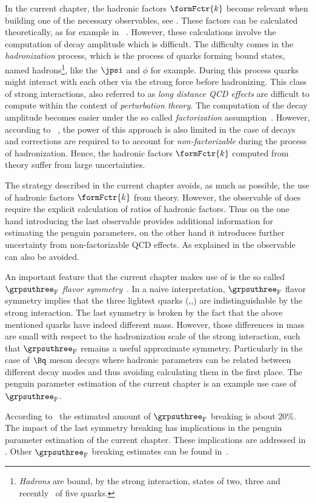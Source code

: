 In the current chapter, the hadronic factors $\formFctr{k}$ become relevant when building
one of the necessary observables, see . These factors can be calculated
theoretically, as for example in ~\cite{DeBruyn-thesis}. However, these calculations involve
the computation of \BJpsiX decay amplitude which is difficult. The difficulty comes in the
{\it hadronization} process, which is the process of quarks forming bound states, named
hadrons\footnote{ {\it Hadrons} are bound, by the strong interaction, states of two,
three and recently~\cite{Aaij:2016nsc} of five quarks.}, like the $\jpsi$ and $\phi$ for example.
During this process quarks might interact with each other via the strong force before hadronizing.
This class of strong interactions, also referred to as {\it long distance QCD effects}
are difficult to compute within the context of {\it perturbation theory}.
The computation of the \BJpsiX decay amplitude becomes easier under the so called
{\it factorization} assumption~\cite{HAAN1970448,Wirbel1985,CABIBBO1978418,FAKIROV1978315}.
However, according to ~\cite{DeBruyn-thesis},
the power of this approach is also limited in the case of \BJpsiX decays and corrections
are required to to account for {\it non-factorizable} during the process of hadronization.
Hence, the hadronic factors $\formFctr{k}$ computed from theory suffer from large uncertainties.

The strategy described in the current chapter avoids, as much as possible, the use of hadronic
factors $\formFctr{k}$ from theory. However, the observable of 
does require the explicit calculation of ratios of hadronic factors. Thus on the one hand
introducing the last observable provides additional information for estimating the penguin
parameters, on the other hand it introduces further uncertainty from non-factorizable QCD effects.
As explained in  the observable  can also be avoided.

An important feature that the current chapter makes use of is the so called
$\grpsuthree_{\rm F}$ {\it flavor symmetry}~\cite{GELLMANN1964214,NEEMAN1961222}.
In a naive interpretation, $\grpsuthree_{\rm F}$ flavor symmetry implies that the three lightest quarks (\uquark,\dquark,\squark)
are indistinguishable by the strong interaction. The last symmetry is broken by the fact that the above
mentioned quarks have indeed different mass. However, those differences in mass are small with respect
to the hadronization scale \lqcd of the strong interaction, such that $\grpsuthree_{\rm F}$
remains a useful approximate symmetry. Particularly in the case of $\Bq$ meson decays where hadronic
parameters can be related between different decay modes and thus avoiding calculating them in the first place.
The penguin parameter estimation of the current chapter is an example use case of $\grpsuthree_{\rm F}$.

According to~\cite{Nagashima:2007qn,Gronau:2013mda} the estimated amount of $\grpsuthree_{\rm F}$ breaking is about $20\%$.
The impact of the last symmetry breaking has implications in the penguin parameter estimation
of the current chapter. These implications are addressed in .
Other $\grpsuthree_{\rm F}$ breaking estimates can be found in~\cite{Charles:2015gya,PDG}.
